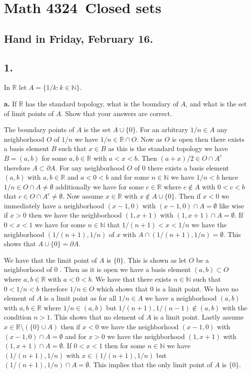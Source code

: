 \documentclass{amsart}
\theoremstyle{plain}
\theoremstyle{definition}
\theoremstyle{remark}
\begin{document}
\section*{Math 4324\  Closed sets } 

\subsection*{Hand in Friday, February 16.} 




\vspace{.15in}
\noindent
\subsection*{1.} In $\mathbb R$ let $A = \{ 1/k : k\in \mathbb N \}$.

\vspace{.1in}
{\bfseries a.} If $\mathbb R$ has the standard topology, what is the boundary of $A$, and what is the set of limit points of $A$. Show that your answers are correct. 
    
The boundary points of $A$ is the set $A\cup \{0\}$. For an arbitrary $1/n\in A$ any neighborhood $O$ of $1/n$ we have $1/n\in \mathbb{R}\cap O$. Now as $O$ is open then there exists a basis element $B$ such that $x\in B$ as this is the standard topology we have $B=(a,b)$ for some $a,b\in \mathbb{R}$ with $a<x<b$. Then  $(a+x)/2 \in O \cap A^c $ therefore $A\subset \partial A$. For any neighborhood $O$ of $0$ there exists a basis element $(a,b)$ with $a,b\in \mathbb{R}$ and $a<0<b$ and for some $n\in \mathbb{N}$ we have $1/n<b$ hence $1/n\in O\cap A\not = \emptyset$ additionally we have for some $c\in \mathbb{R}$ where $c\not \in A$ with $0<c<b$ that $c\in O\cap A^c\not = \emptyset$. Now assume $x\in \mathbb{R}$ with $x\not \in A\cup \{0\}$. Then if $x<0$ we immediately have a neighborhood $(x-1,0)$ with $(x-1,0)\cap A=\emptyset$ like wise if $x>0$ then we have the neighborhood $(1,x+1) $ with $(1,x+1)\cap A=\emptyset$. If $0<x<1$ we have for some $n\in \mathbb{N}$ that $1/(n+1)<x<1/n$ we have the neighborhood $(1/(n+1),1/n)$ of $x$  with $A\cap (1/(n+1),1/n)=\emptyset$. This shows that $A\cup \{0\}=\partial A$.


We have that the limit point of $A$ is $\{0\}$. This is shown as let $O$ be a neighborhood of $0$
. Then as it is open we have a basis element $ (a,b)\subset O$ where $a,b\in \mathbb{R}$ with $a<0<b$. We have that there exists $n\in \mathbb{N}$ such that $0<1/n<b$ therefore $1/n\in O$ which shows that $0$ is a limit point. We have no element of $A$ is a limit point as for all $1/n\in A$ we have a neighborhood $(a,b)$ with $a,b\in \mathbb{R}$ where $1/n \in (a,b)$ but $1/(n+1),1/(n-1)\not \in (a,b)$ with the condition $n>1$. This shows that no element of $A$ is a limit point. Lastly assume $x\in \mathbb{R}\setminus(\{0\}\cup A)$ then if $x<0$ we have the neighborhood $(x-1,0)$ with $(x-1,0)\cap A=\emptyset$ and for $x>0$ we have the neighborhood $(1,x+1)$ with $(1,x+1)\cap A=\emptyset$. If $0<x<1$ then for some $n\in \mathbb{N}$ we have $(1/(n+1),1/n)$ with $x\in (1/(n+1),1/n)$ but $(1/(n+1),1/n)\cap A= \emptyset$. This implies that the only limit point of $A$ is $\{0\}$. 
\end{document}

